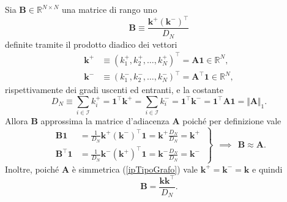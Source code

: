             \begin{dfn}
                \label{defMatriceGradi}
                Sia \(\mathbf B\in\mathbb R^{N\times N}\) una matrice di rango uno
                \[
                    \mathbf B\equiv\frac{\mathbf k^+(\mathbf k^-)^\top}{D_N}
                \]
                definite tramite il prodotto diadico dei vettori
                \begin{equation}
                    \label{eqCriterioApprossimazioneA}
                    \begin{aligned}
                        \mathbf k^+&\equiv(k^+_1,k^+_2,\ldots,k^+_N)^\top=\mathbf A\mathbf 1\in\mathbb R^N,\\
                        \mathbf k^-&\equiv(k^-_1,k^-_2,\ldots,k^-_N)^\top=\mathbf A^\top\mathbf 1\in\mathbb R^N,
                    \end{aligned}
                \end{equation}
                rispettivamente dei gradi uscenti ed entranti, e la costante\footnotemark{}%
                \begin{equation}
                    \label{eqNormaUnoMatriceAdiacenza}
                    D_N\equiv\sum_{i\in\mathcal I}k^+_i=\mathbf1^\top\mathbf k^+
                    =\sum_{i\in\mathcal I}k^-_i=\mathbf1^\top\mathbf k^-
                    =\mathbf1^\top\mathbf A\mathbf1=\Vert\mathbf A\Vert_1.
                \end{equation}
                Allora \(\mathbf B\) approssima la matrice d'adiacenza \(\mathbf A\) poiché per definizione vale 
                \[
                    \left.\begin{aligned}
                        \mathbf B\mathbf 1
                        &=\frac1{D_N}\mathbf k^+(\mathbf k^-)^\top\mathbf 1
                        =\mathbf k^+\frac{D_N}{D_N}=\mathbf k^+\\
                        \mathbf B^\top\mathbf 1
                        &=\frac1{D_N}\mathbf k^-(\mathbf k^+)^\top\mathbf 1
                        =\mathbf k^-\frac{D_N}{D_N}=\mathbf k^-\
                    \end{aligned}\right\}
                    \ \ \implies\ \ \mathbf B\approx\mathbf A.
                \]
                Inoltre, poiché \(\mathbf A\) è simmetrica (\cref{ipTipoGrafo}) vale \(\mathbf k^+=\mathbf k^-=\mathbf k\) e quindi
                \[
                    \mathbf B=\frac{\mathbf k\mathbf k^\top}{D_N}.
                \]
            \end{dfn}
            
